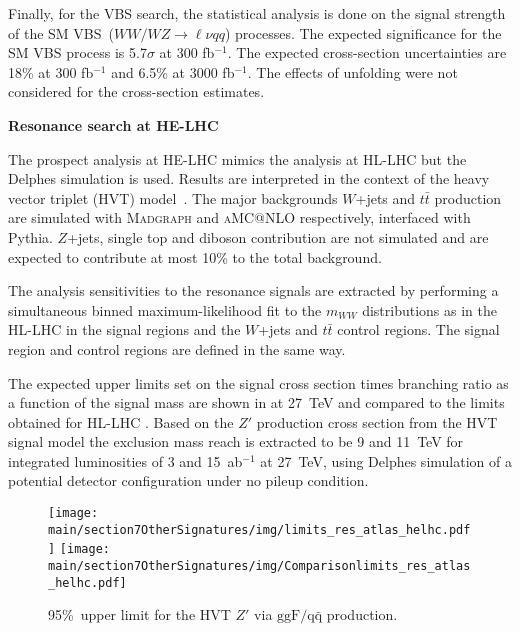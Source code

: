 Finally, for the VBS search, the statistical analysis is done on the signal strength of the SM VBS~($WW/WZ \rightarrow \ell\nu qq$) processes.
The expected significance for the SM VBS process is 5.7$\sigma$ at 300 fb$^{-1}$. The expected cross-section uncertainties are 18\% at  300 fb$^{-1}$ 
and 6.5\% at 3000 fb$^{-1}$. The effects of unfolding were not considered for the cross-section estimates.
 
\textbf{Resonance search at HE-LHC}

The prospect analysis at HE-LHC  mimics the analysis at HL-LHC but the Delphes simulation is used. 
Results are  interpreted in the context of the  heavy vector triplet (HVT) model~\cite{HVT,Pappadopulo:2014qza}.
The major backgrounds $W$+jets and $t\bar{t}$ production are simulated with \textsc{Madgraph} and \textsc{aMC@NLO} respectively, interfaced with Pythia. $Z$+jets, single top and diboson contribution are not simulated and are expected to contribute at most 10\% to the total background.

The analysis sensitivities to the resonance signals are extracted by performing a simultaneous binned maximum-likelihood fit to the $m_{WW}$ distributions as in the HL-LHC in the signal regions and the $W$+jets and $t \bar{t}$ control regions. The signal region and control regions are defined in the same way.

The expected upper limits set on the signal cross section times branching ratio as a function of the signal mass are shown in  at 27~TeV and compared to the limits obtained for HL-LHC . 
Based on the $Z'$ production cross section from the HVT signal model the exclusion mass reach is extracted to be 9 and 11~TeV for integrated luminosities of 3 and 15~ab$^{-1}$ at 27~TeV, using 
Delphes simulation of a potential detector configuration under no pileup condition.

\begin{figure}
\centering
\texttt{[image: \\main/section7OtherSignatures/img/limits\_res\_atlas\_helhc.pdf]}
\texttt{[image: \\main/section7OtherSignatures/img/Comparisonlimits\_res\_atlas\_helhc.pdf]}
\caption{95\%~\cl upper limit for the HVT $Z'$  via $\mathrm{ggF/q\bar{q}}$ production.}
\label{fig:Limits}
\end{figure} 








